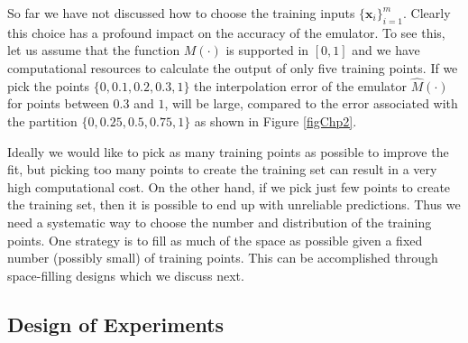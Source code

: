 \documentclass{sfuthesis}
\newcommand{\x}{\textbf{x}}
\begin{document}
So far we have not discussed  how to choose the training inputs $\{\x_{i}\}_{i=1}^{m}$. 
Clearly this choice has a profound  impact on the accuracy of the emulator.
To see this, let us assume that the function $M(\cdot)$ is supported in $[0,1]$ and we  have
computational resources to calculate the output of only five training
points. If we pick the points $\{0,0.1,0.2,0.3,1\}$ the interpolation error of the emulator
$\widehat{M}(\cdot)$  for points between $0.3$ and $1$, 
will be large, compared to the error associated with the partition $\{0,0.25,0.5,0.75,1\}$ as
shown in Figure \ref{figChp2}.
 




Ideally we would like to pick as many training points as possible to improve the fit, 
but picking too many points
to create the training set can result in a very high computational cost. On the other hand, if we pick 
just few points to create the training set, then it is possible to end up with unreliable predictions. 
Thus we need a systematic way to choose the number and distribution of  the training points. One strategy is to  
 fill as much of the space as possible given a fixed number (possibly small) of  training points. 
This can be accomplished
through    space-filling designs which we  discuss next. 
\newline

\subsection{Design of Experiments }\label{secDesignofExperiments}


\end{document}
